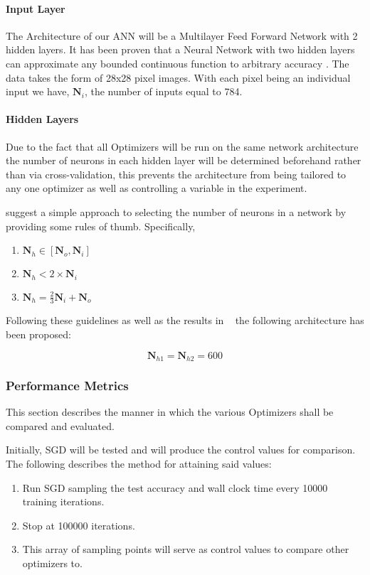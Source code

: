 \documentclass{article}
\begin{document}
\paragraph{Input Layer}
The Architecture of our ANN will be a Multilayer Feed Forward Network with 2 hidden layers.
It has been proven that a Neural Network with two hidden layers can approximate any bounded continuous function to arbitrary accuracy \cite{Hornik1989}. The data takes the form of 28x28 pixel images. With each pixel being an individual input we have, $\boldsymbol{N}_i$, the number of inputs equal to 784.

\paragraph{Hidden Layers}
 Due to the fact that all Optimizers will be run on the same network architecture the number of neurons in each hidden layer will be determined beforehand rather than via cross-validation, this prevents the architecture from being tailored to any one optimizer as well as controlling a variable in the experiment.
 
 \citet{panchal2014review} suggest a simple approach to selecting the number of neurons in a network by providing some rules of thumb. Specifically,
\begin{enumerate}
	\item	$\boldsymbol{N}_h\in[\boldsymbol{N}_o, \boldsymbol{N}_i]$
	
	\item$\boldsymbol{N}_h < 2\times\boldsymbol{N}_i$
	
	\item$\boldsymbol{N}_h = \frac{2}{3}\boldsymbol{N}_i + \boldsymbol{N}_o$
\end{enumerate}
 
 Following these guidelines as well as the results in ~\cite{deepsimpleMLP} the following architecture has been proposed:
 
 \begin{equation}
 	\boldsymbol{N}_{h1} = \boldsymbol{N}_{h2} = 600
 \end{equation}

\subsubsection{Performance Metrics}
This section describes the manner in which the various Optimizers shall be compared and evaluated.

Initially, SGD will be tested and will produce the control values for comparison. The following describes the method for attaining said values:
\begin{enumerate}
	\item Run SGD sampling the test accuracy and wall clock time every 10000 training iterations.
	\item Stop at 100000 iterations.
	\item This array of sampling points will serve as control values to compare other optimizers to. 
\end{enumerate}
\end{document}
